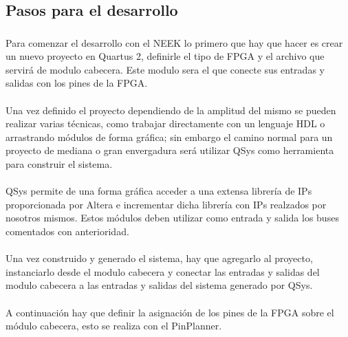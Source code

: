 \documentclass[a4paper,12pt,titlepage,final]{book}
\begin{document}
\subsection{Pasos para el desarrollo}
\subsubsection*{}
\paragraph{}
Para comenzar el desarrollo con el NEEK lo primero que hay que hacer es crear un nuevo proyecto en Quartus 2, definirle el tipo de FPGA y el archivo que servirá de modulo cabecera. Este modulo sera el que conecte sus entradas y salidas con los pines de la FPGA.

\paragraph{}
Una vez definido el proyecto dependiendo de la amplitud del mismo se pueden realizar varias técnicas, como trabajar directamente con un lenguaje HDL o arrastrando módulos de forma gráfica; sin embargo el camino normal para un proyecto de mediana o gran envergadura será utilizar QSys como herramienta para construir el sistema.

\paragraph{}
QSys permite de una forma gráfica acceder a una extensa librería de IPs proporcionada por Altera e incrementar dicha librería con IPs realzados por nosotros mismos. Estos módulos deben utilizar como entrada y salida los buses comentados con anterioridad.

\paragraph{}
Una vez construido y generado el sistema, hay que agregarlo al proyecto, instanciarlo desde el modulo cabecera y conectar las entradas y salidas del modulo cabecera a las entradas y salidas del sistema generado por QSys.

\paragraph{}
A continuación hay que definir la asignación de los pines de la FPGA sobre el módulo cabecera, esto se realiza con el PinPlanner.
\end{document}
